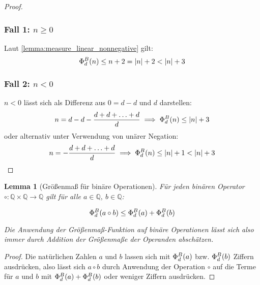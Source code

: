 \documentclass{article}
\newtheorem{lemma}[theorem]{Lemma}
\theoremstyle{nonumberplain}
\newtheorem{proof}{Beweis}
\begin{document}
\begin{proof}
    \subsubsection*{Fall 1: \(n \geq 0\)}

    Laut \ref{lemma:measure_linear_nonnegative} gilt:
    \[\Phi_{d}^{B}(n) \leq n + 2 = |n| + 2 < |n| + 3\]

    \subsubsection*{Fall 2: \(n < 0\)}
        
    \(n < 0\) lässt sich als Differenz aus \(0 = d-d\) und \(d\) darstellen:
    \[n = d - d - \frac{d+d+\ldots+d}{d} \implies \Phi_{d}^{B}(n) \leq |n| + 3\]
    oder alternativ unter Verwendung von unärer Negation:
    \[n = -\frac{d+d+\ldots+d}{d} \implies \Phi_{d}^{B}(n) \leq |n| + 1 < |n| + 3\]
\end{proof}

\begin{lemma}[Größenmaß für binäre Operationen]\label{lemma:phi_binary}
    Für jeden binären Operator \(\circ : \mathbb{Q} \times \mathbb{Q} \to \mathbb{Q}\) gilt für alle \(a\in\mathbb{Q},\ b\in\mathbb{Q}\):

    \[\Phi_{d}^{B}(a \circ b) \leq \Phi_{d}^{B}(a) + \Phi_{d}^{B}(b)\]

    Die Anwendung der Größenmaß-Funktion auf binäre Operationen lässt sich also immer durch Addition der Größenmaße der Operanden abschätzen.
\end{lemma}
\begin{proof}
    Die natürlichen Zahlen \(a\) und \(b\) lassen sich mit \(\Phi_{d}^{B}(a)\) bzw. \(\Phi_{d}^{B}(b)\) Ziffern ausdrücken, also lässt sich \(a \circ b\) durch Anwendung der Operation \(\circ\) auf die Terme für \(a\) und \(b\) mit \(\Phi_{d}^{B}(a) + \Phi_{d}^{B}(b)\) oder weniger Ziffern ausdrücken.
\end{proof}
\end{document}
